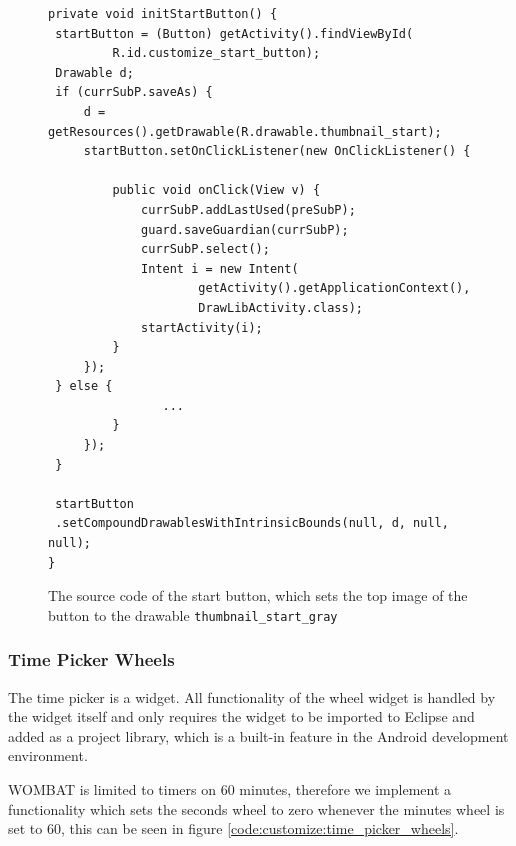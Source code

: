 \begin{figure}[H]
\begin{lstlisting}
private void initStartButton() {
 startButton = (Button) getActivity().findViewById(
		 R.id.customize_start_button);
 Drawable d;
 if (currSubP.saveAs) {
	 d = getResources().getDrawable(R.drawable.thumbnail_start);
	 startButton.setOnClickListener(new OnClickListener() {

		 public void onClick(View v) {
			 currSubP.addLastUsed(preSubP);
			 guard.saveGuardian(currSubP);
			 currSubP.select();
			 Intent i = new Intent(
					 getActivity().getApplicationContext(),
					 DrawLibActivity.class);
			 startActivity(i);
		 }
	 });
 } else {
				...
		 }
	 });
 }

 startButton
 .setCompoundDrawablesWithIntrinsicBounds(null, d, null, null);
}
\end{lstlisting}
\caption{The source code of the start button, which sets the top image of the button to the drawable \texttt{thumbnail\_start\_gray}}%
\label{code:customize:start_button}%
\end{figure}

\subsubsection*{Time Picker Wheels}
The time picker is a widget\cite{web:android:customize:wheel}.
All functionality of the wheel widget is handled by the widget itself and only requires the widget to be imported to Eclipse and added as a project library, which is a built-in feature in the Android development environment.

WOMBAT is limited to timers on 60 minutes, therefore we implement a functionality which sets the seconds wheel to zero whenever the minutes wheel is set to 60, this can be seen in figure \ref{code:customize:time_picker_wheels}.

